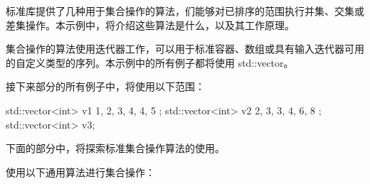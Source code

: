 标准库提供了几种用于集合操作的算法，们能够对已排序的范围执行并集、交集或差集操作。本示例中，将介绍这些算法是什么，以及其工作原理。


集合操作的算法使用迭代器工作，可以用于标准容器、数组或具有输入迭代器可用的自定义类型的序列。本示例中的所有例子都将使用 std::vector。

接下来部分的所有例子中，将使用以下范围：

\begin{cpp}
std::vector<int> v1{ 1, 2, 3, 4, 4, 5 };
std::vector<int> v2{ 2, 3, 3, 4, 6, 8 };
std::vector<int> v3;
\end{cpp}

下面的部分中，将探索标准集合操作算法的使用。


使用以下通用算法进行集合操作：

